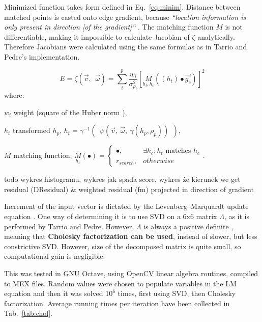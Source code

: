 Minimized function takes form defined in Eq.~\ref{eq:minim}. Distance between matched points is casted onto edge gradient, because \textit{``location information is only present in direction [of the gradient]``}  \cite{jose2015realtime}. The matching function $M$ is not differentiable, making it impossible to calculate Jacobian of $\zeta$ analytically. Therefore Jacobians were calculated using the same formulas as in Tarrio and Pedre's implementation.

\begin{equation}
E = \zeta \left( \vec{v},\ \ \vec{\omega} \right) = \sum_{i}^{p} \frac{w_i}{\sigma_{\rho_{i}}^2} \left[ \underset{h_t, h_c}{M} \left( \left( h_t \right) \bullet \vec{g_c} \right) \right] ^2
\label{eq:minim}
\end{equation}
where:
\begin{eqwhere}[2cm]
	\item[$w_i$] weight (square of the Huber norm \cite{huber1964robust}),
	\item[$h_t$] transformed $h_p$, $h_{t} = \gamma^{-1}\left(\ \  \psi \left( \vec{v},\ \vec{\omega},\ \gamma \left( h_p, \rho_{p} \right) \right)\ \  \right)$,
	\item[$M$] matching function, $\underset{h_t}{M}(\bullet) = \begin{cases} 
	\bullet, & \exists h_c : h_t \textrm{ matches } h_c \\
	r_{search}, & otherwise
	\end{cases}$.
\end{eqwhere}

todo wykres histogramu, wykres jak spada score, wykres że kierunek
we get residual (DResidual) \& weighted residual (fm) projected in direction of gradient

Increment of the input vector is dictated by the Levenberg–Marquardt update equation \cite{press2007numerical}. One way of determining it is to use SVD on a 6x6 matrix $\Lambda$, as it is performed by Tarrio and Pedre. However, $\Lambda$ is always a positive definite \cite{madsen2004methods}, meaning that \textbf{Cholesky factorization can be used}, instead of slower, but less constrictive SVD. However, size of the decomposed matrix is quite small, so computational gain is negligible.

This was tested in GNU Octave, using OpenCV \cite{opencv} linear algebra routines, compiled to MEX files. Random values were chosen to populate variables in the LM equation and then it was solved $10^6$ times, first using SVD, then Cholesky factorization. Average running times per iteration have been collected in Tab.~\ref{tab:chol}.

